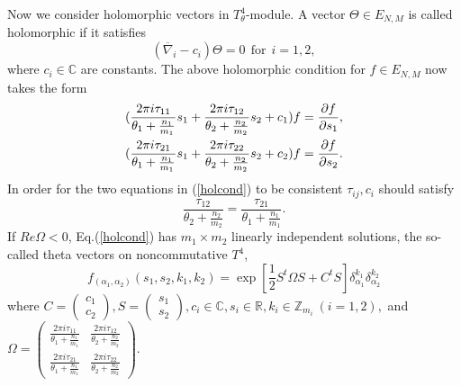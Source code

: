 \documentclass[12pt, a4paper]{article}
\newcommand{\Z}{{\mathbb Z}}
\newcommand{\R}{{\mathbb R}}
\newcommand{\C}{{\mathbb C}}
\begin{document}
Now we consider holomorphic vectors  in $T_\theta^4$-module. A
vector $\Theta \in E_{N,M} $ is called holomorphic
\cite{schwarz01} if it satisfies
\begin{equation} \label{thetavector}
( \overline{\nabla}_i -c_i ) \Theta = 0 \ \ \text{for} \ \  i=1,2,
\end{equation}
where $ c_i  \in \C $ are constants.
 The above holomorphic
condition for $ f \in E_{N,M} $ now takes the form
\begin{align} \label{holcond}
( \frac{2 \pi i \tau_{11} }{\theta_1 + \frac{n_1}{m_1}} s_1  +
 \frac{2 \pi i \tau_{12} }{\theta_2 + \frac{n_2}{m_2}} s_2
  + c_1 ) f
 & =   \frac{\partial f}{\partial s_1} , \notag \\
 ( \frac{2 \pi i \tau_{21} }{\theta_1 + \frac{n_1}{m_1}} s_1  +
 \frac{2 \pi i \tau_{22} }{\theta_2 + \frac{n_2}{m_2}} s_2
  + c_2 ) f
 & =  \frac{\partial f}{\partial s_2} .
\end{align}
%
In order for the two equations in (\ref{holcond}) to be consistent
$\tau_{ij}, c_i$ should satisfy
\begin{equation} \label{holcondt4}
\frac{\tau_{12}}{ \theta_2 + \frac{n_2}{m_2}} = \frac{\tau_{21}}
{\theta_1 + \frac{n_1}{m_1}}  .
\end{equation}
If $ Re \Omega < 0$, Eq.(\ref{holcond}) has $m_1 \times m_2$
linearly independent solutions, the so-called theta vectors
\cite{schwarz01,ds02} on noncommutative $T^4$,
\begin{equation} \label{thetat4}
f_{(\alpha_1 , \alpha_2 )} (s_1 , s_2 , k_1, k_2 ) = \exp [
\frac{1}{2} S^t \Omega S + C^t S ] \delta_{\alpha_1}^{k_1}
\delta_{\alpha_2}^{k_2}
\end{equation}
where $C= \begin{pmatrix} c_1 \\ c_2 \end{pmatrix},
S=\begin{pmatrix} s_1 \\ s_2 \end{pmatrix},  c_i \in \C,  s_i \in
\R,  k_i \in \Z_{m_i} \ (i =1,2), $ and $ \Omega =
\begin{pmatrix} \frac{2 \pi i \tau_{11} }{\theta_1 + \frac{n_1}{m_1}} &
\frac{2 \pi i \tau_{12} }{\theta_2 + \frac{n_2}{m_2}} \\
\frac{2 \pi i \tau_{21} }{\theta_1 + \frac{n_1}{m_1}} & \frac{2\pi
i \tau_{22} }{\theta_2 + \frac{n_2}{m_2}}
\end{pmatrix} $.
\\
\end{document}
